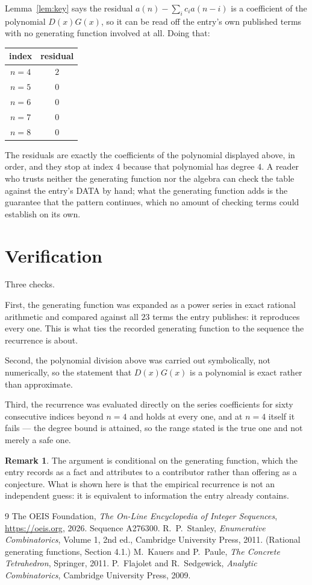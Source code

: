 \documentclass[11pt,a4paper]{article}
\theoremstyle{plain}
\theoremstyle{definition}
\newtheorem{remark}[theorem]{Remark}
\begin{document}
Lemma~\ref{lem:key} says the residual $a(n)-\sum_ic_ia(n-i)$ is a coefficient of the
polynomial $D(x)G(x)$, so it can be read off the entry's own published terms with no
generating function involved at all. Doing that:
\begin{center}
\begin{tabular}{cc}
index & residual \\ \hline
$n=4$ & $2$ \\
$n=5$ & $0$ \\
$n=6$ & $0$ \\
$n=7$ & $0$ \\
$n=8$ & $0$
\end{tabular}
\end{center}
The residuals are exactly the coefficients of the polynomial displayed above, in order, and
they stop at index $4$ because that polynomial has degree $4$. A reader who trusts
neither the generating function nor the algebra can check the table against the entry's DATA
by hand; what the generating function adds is the guarantee that the pattern continues, which
no amount of checking terms could establish on its own.

\section{Verification}

Three checks.

First, the generating function was expanded as a power series in exact rational arithmetic and
compared against all $23$ terms the entry publishes: it reproduces every one. This is
what ties the recorded generating function to the sequence the recurrence is about.

Second, the polynomial division above was carried out symbolically, not numerically, so the
statement that $D(x)G(x)$ is a polynomial is exact rather than approximate.

Third, the recurrence was evaluated directly on the series coefficients for sixty consecutive
indices beyond $n=4$ and holds at every one, and at $n=4$ itself it fails --- the
degree bound is attained, so the range stated is the true one and not merely a safe one.

\begin{remark}
The argument is conditional on the generating function, which the entry records as a fact and
attributes to a contributor rather than offering as a conjecture. What is shown here is that
the empirical recurrence is not an independent guess: it is equivalent to information the
entry already contains.
\end{remark}

\begin{thebibliography}{9}
 The OEIS Foundation, \emph{The On-Line Encyclopedia of Integer
Sequences}, \url{https://oeis.org}, 2026. Sequence A276300.
 R.~P.~Stanley, \emph{Enumerative Combinatorics}, Volume 1, 2nd ed.,
Cambridge University Press, 2011. (Rational generating functions, Section 4.1.)
 M.~Kauers and P.~Paule, \emph{The Concrete Tetrahedron}, Springer, 2011.
 P.~Flajolet and R.~Sedgewick, \emph{Analytic Combinatorics}, Cambridge
University Press, 2009.
\end{thebibliography}
\end{document}
